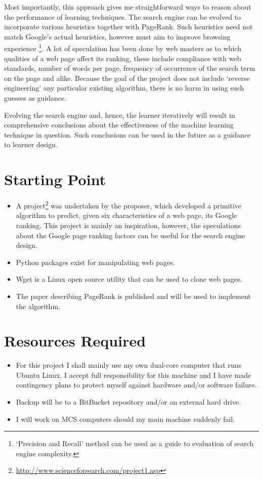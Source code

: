 Most importantly, this approach gives me straightforward ways to reason about the performance of learning techniques. The search engine can be evolved to incorporate various heuristics together with PageRank. Such heuristics need not match Google's actual heuristics, however must aim to improve browsing experience \footnote{`Precision and Recall' method can be used as a guide to evaluation of search engine complexity.}. A lot of speculation has been done by web masters as to which qualities of a web page affect its ranking, these include compliance with web standards, number of words per page, frequency of occurrence of the search term on the page and alike. Because the goal of the project does not include `reverse engineering' any particular existing algorithm, there is no harm in using such guesses as guidance. 

Evolving the search engine and, hence, the learner iteratively will result in comprehensive conclusions about the effectiveness of the machine learning technique in question. Such conclusions can be used in the future as a guidance to learner design. 

\section*{\bf Starting Point}

\begin{itemize}
\item A project\footnote{\url{http://www.scienceforsearch.com/project1.asp}} was undertaken by the proposer, which developed a primitive algorithm to predict, given six characteristics of a web page, its Google ranking.  This project is mainly an inspiration, however, the speculations about the Google page ranking factors can be useful for the search engine design. 
\item Python packages exist for manipulating web pages.
\item Wget is a Linux open source utility that can be used to clone web pages.
\item The paper describing PageRank is published and will be used to implement the algorithm.
\end{itemize}


\section*{\bf Resources Required}
\begin{itemize}
\item For this project I shall mainly use my own dual-core computer that runs Ubuntu Linux. I accept full responsibility for this machine and I have made contingency plans to protect myself against hardware and/or software failure.
\item Backup will be to a BitBucket repository and/or an external hard drive.
\item I will work on MCS computers should my main machine suddenly fail. 
\end{itemize}
